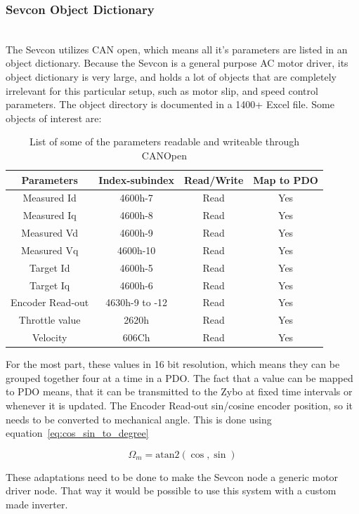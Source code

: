 \subsubsection{Sevcon Object Dictionary}\label{sub:sevcon_object_dictionary}~\\
The Sevcon utilizes CAN open, which means all it's parameters are listed in an object dictionary.
Because the Sevcon is a general purpose AC motor driver, its object dictionary is very large, and holds a lot of objects that are completely irrelevant for this particular setup, such as motor slip, and speed control parameters. 
The object directory is documented in a 1400+ Excel file. 
Some objects of interest are:

\begin{table}[h]
	\centering
	\begin{tabular}{| c | c | c | c |}
		\hline
		Parameters & Index-subindex & Read/Write & Map to PDO \\ %
		\hline
		Measured Id & 4600h-7 & Read & Yes \\ %
		Measured Iq & 4600h-8 & Read & Yes \\ %
		Measured Vd & 4600h-9 & Read & Yes \\ %
		Measured Vq & 4600h-10 & Read & Yes \\ %
		Target Id & 4600h-5 & Read & Yes \\ %
		Target Iq & 4600h-6 & Read & Yes \\ %
		Encoder Read-out & 4630h-9 to -12 & Read & Yes \\ %
		Throttle value & 2620h & Read & Yes \\ %
		Velocity & 606Ch & Read & Yes \\ %
		\hline	
	\end{tabular}
	\caption{List of some of the parameters readable and writeable through CANOpen}
	\label{tab:parameters_of_interest}
\end{table}

For the most part, these values in 16 bit resolution, which means they can be grouped together four at a time in a PDO.
The fact that a value can be mapped to PDO means, that it can be transmitted to the Zybo at fixed time intervals or whenever it is updated.
The Encoder Read-out sin/cosine encoder position, so it needs to be converted to mechanical angle. 
This is done using equation~\ref{eq:cos_sin_to_degree}

\begin{equation}
\Omega_m = \mathrm{atan2}(\cos,\sin)
\label{eq:cos_sin_to_degree}
\end{equation}

These adaptations need to be done to make the Sevcon node a generic motor driver node.
That way it would be possible to use this system with a custom made inverter.
